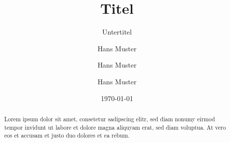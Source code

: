 

\titlehead{BSc Computational and Data Science\\CDSnnn Modulname\\Dozent: Prof. Hans Muster\hfill}
\title{Titel}
\subtitle{Untertitel}
\author[1,*]{Hans Muster}
\author[1]{Hans Muster}
\author[1]{Hans Muster}
\date{\today}
\maketitle

\begin{abstract}
Lorem ipsum dolor sit amet, consetetur sadipscing elitr, sed diam nonumy eirmod tempor invidunt ut labore et dolore magna aliquyam erat, sed diam voluptua. At vero eos et accusam et justo duo dolores et ea rebum.
\end{abstract}